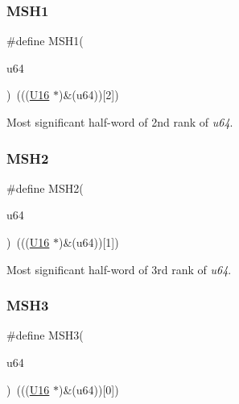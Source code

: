 \subsubsection{\texorpdfstring{MSH1}{MSH1}}
{\footnotesize\ttfamily \#define M\+S\+H1(\begin{DoxyParamCaption}\item[{}]{u64 }\end{DoxyParamCaption})~(((\mbox{\hyperlink{group__group__sam0__utils_ga0a0a322d5fa4a546d293a77ba8b4a71f}{U16}} $\ast$)\&(u64))\mbox{[}2\mbox{]})}



Most significant half-\/word of 2nd rank of {\itshape u64}. 

\mbox{\label{group__group__sam0__utils_ga5d32ec744212194c8106c51b89a5dfe9}} 
\subsubsection{\texorpdfstring{MSH2}{MSH2}}
{\footnotesize\ttfamily \#define M\+S\+H2(\begin{DoxyParamCaption}\item[{}]{u64 }\end{DoxyParamCaption})~(((\mbox{\hyperlink{group__group__sam0__utils_ga0a0a322d5fa4a546d293a77ba8b4a71f}{U16}} $\ast$)\&(u64))\mbox{[}1\mbox{]})}



Most significant half-\/word of 3rd rank of {\itshape u64}. 

\mbox{\label{group__group__sam0__utils_gabb233f238b63c12d2ff361d9ddb3114b}} 
\subsubsection{\texorpdfstring{MSH3}{MSH3}}
{\footnotesize\ttfamily \#define M\+S\+H3(\begin{DoxyParamCaption}\item[{}]{u64 }\end{DoxyParamCaption})~(((\mbox{\hyperlink{group__group__sam0__utils_ga0a0a322d5fa4a546d293a77ba8b4a71f}{U16}} $\ast$)\&(u64))\mbox{[}0\mbox{]})}




